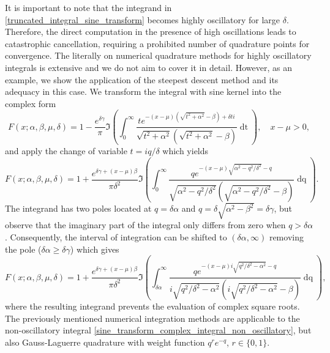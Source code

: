 \documentclass[10pt,a4paper,oneside]{article}
\numberwithin{equation}{section}
\begin{document}
It is important to note that the integrand in \eqref{truncated_integral_sine_transform} becomes highly oscillatory for large $\delta$. Therefore, the direct computation in the presence of high oscillations leads to catastrophic cancellation, requiring a prohibited number of quadrature points for convergence. The literally on numerical quadrature methods for highly oscillatory integrals is extensive and we do not aim to cover it in detail. However, as an example, we show the application of the steepest descent method and its adequacy in this case. We transform the integral with sine kernel into the complex form
\begin{equation}\label{sine_transform_complex_integral}
F(x; \alpha, \beta, \mu, \delta) = 1 - \frac{e^{\delta \gamma}}{\pi}\Im\left(\int_0^{\infty} \frac{t e^{-(x-\mu)\left(\sqrt{t^2 + \alpha^2} - \beta\right) + \delta t i}}{\sqrt{t^2 + \alpha^2}\left(\sqrt{t^2 + \alpha^2} - \beta\right)}\mathop{dt}\right), \quad x-\mu > 0,
\end{equation}
and apply the change of variable $t = i q / \delta$ which yields
\begin{equation}
F(x; \alpha, \beta, \mu, \delta) = 1 + \frac{e^{\delta \gamma + (x-\mu) \beta}}{\pi \delta^2} \Im\left(\int_{0}^{\infty} \frac{q e^{-(x-\mu)\sqrt{\alpha^2 - q^2/\delta^2} - q}}{\sqrt{\alpha^2 - q^2/\delta^2}\left(\sqrt{\alpha^2 - q^2/\delta^2} -\beta\right)} \mathop{dq}\right).
\end{equation}
The integrand has two poles located at $q = \delta \alpha$ and $q = \delta\sqrt{\alpha^2 - \beta^2} = \delta \gamma$, but observe that the imaginary part of the integral only differs from zero when $q > \delta \alpha$. Consequently, the interval of integration can be shifted to $(\delta \alpha, \infty)$ removing the pole ($\delta \alpha \ge \delta \gamma$) which gives
\begin{equation}\label{sine_transform_complex_integral_non_oscillatory}
F(x; \alpha, \beta, \mu, \delta) = 1 + \frac{e^{\delta \gamma + (x-\mu) \beta}}{\pi \delta^2} \Im\left(\int_{\delta\alpha}^{\infty} \frac{q e^{-(x-\mu)i\sqrt{q^2/\delta^2 - \alpha^2} - q}}{i\sqrt{q^2/\delta^2 - \alpha^2}\left(i\sqrt{q^2/\delta^2 - \alpha^2} -\beta\right)} \mathop{dq}\right),
\end{equation}
where the resulting integrand prevents the evaluation of complex square roots. The previously mentioned numerical integration methods are applicable to the non-oscillatory integral \eqref{sine_transform_complex_integral_non_oscillatory}, but also Gauss-Laguerre quadrature with weight function $q^r e^{-q}$, $r \in \{0, 1\}$.
\end{document}
